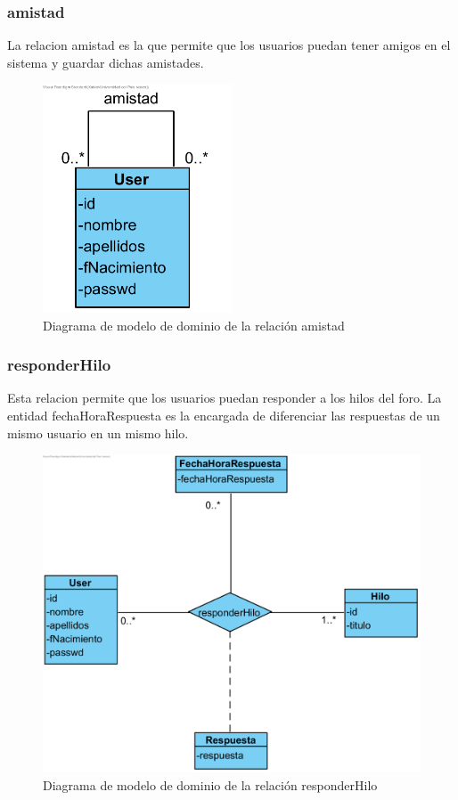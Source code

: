 ﻿\documentclass{report}
\begin{document}
                \subsubsection{amistad}
                    La relacion amistad es la que permite que los usuarios puedan tener amigos en el sistema y guardar dichas amistades. 
                    \begin{figure}[H]
                        \centering
                        \includegraphics[width=0.5\textwidth]{img/dominio/amistad.png}
                        \caption{Diagrama de modelo de dominio de la relación amistad}
                    \end{figure}
                \clearpage
                \subsubsection{responderHilo}
                    Esta relacion permite que los usuarios puedan responder a los hilos del foro. La entidad fechaHoraRespuesta es la encargada de diferenciar las respuestas de un mismo usuario en un mismo hilo.
                    \begin{figure}[H]
                        \centering
                        \includegraphics[width=1.0\textwidth]{img/dominio/responderHilo.png}
                        \caption{Diagrama de modelo de dominio de la relación responderHilo}
                    \end{figure}
                \clearpage
\end{document}
